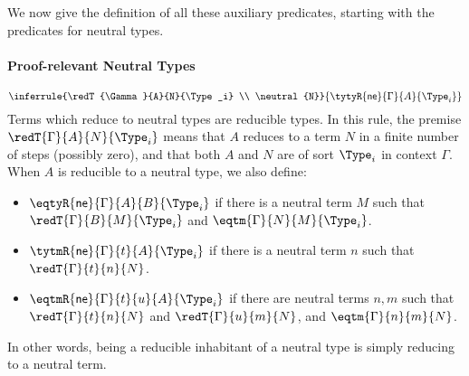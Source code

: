 We now give the definition of all these auxiliary predicates, starting
with the predicates for neutral types.

\paragraph{Proof-relevant Neutral Types}

\[
  \inferrule{\redT{\Gamma}{A}{N}{\Type_i} \\ \neutral{N}}
  {\tytyR{\mathsf{ne}}{\Gamma}{A}{\Type_i}}
\]
Terms which reduce to neutral types are reducible types.
In this rule, the premise \( \redT{\Gamma}{A}{N}{\Type_i} \) means that \( A \) 
reduces to a term \( N \) in a finite number of steps (possibly zero), and that 
both \( A \) and \( N \) are of sort \( \Type_i \) in context \( \Gamma \).
%
When $A$ is reducible to a neutral type, we also define:
\begin{itemize}
  \item \( \eqtyR{\mathsf{ne}}{\Gamma}{A}{B}{\Type_i} \) if there is a neutral term \( M \) such that
    \( \redT{\Gamma}{B}{M}{\Type_i} \) and \( \eqtm{\Gamma}{N}{M}{\Type_i} \).
  \item \( \tytmR{\mathsf{ne}}{\Gamma}{t}{A}{\Type_i} \) if there is a neutral term \( n \) such that
    \( \redT{\Gamma}{t}{n}{N} \).
  \item \( \eqtmR{\mathsf{ne}}{\Gamma}{t}{u}{A}{\Type_i} \) if there are neutral terms \( n, m \) such that
    \( \redT{\Gamma}{t}{n}{N} \) and \( \redT{\Gamma}{u}{m}{N} \), and
    \( \eqtm{\Gamma}{n}{m}{N} \).
\end{itemize}

In other words, being a reducible inhabitant of a neutral type is simply
reducing to a neutral term.

